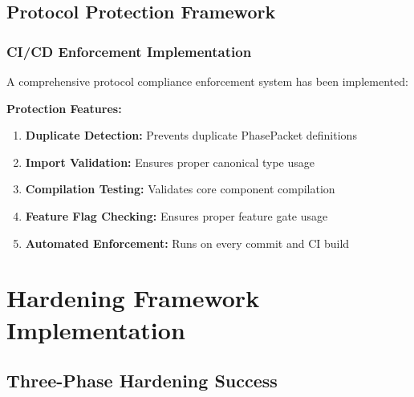 \documentclass[11pt,a4paper]{article}
\begin{document}
\subsection{Protocol Protection Framework}

\subsubsection{CI/CD Enforcement Implementation}
A comprehensive protocol compliance enforcement system has been implemented:

\begin{center}
\end{center}

\textbf{Protection Features:}
\begin{enumerate}
    \item \textbf{Duplicate Detection:} Prevents duplicate PhasePacket definitions
    \item \textbf{Import Validation:} Ensures proper canonical type usage
    \item \textbf{Compilation Testing:} Validates core component compilation
    \item \textbf{Feature Flag Checking:} Ensures proper feature gate usage
    \item \textbf{Automated Enforcement:} Runs on every commit and CI build
\end{enumerate}

\section{Hardening Framework Implementation}

\subsection{Three-Phase Hardening Success}
\end{document}
